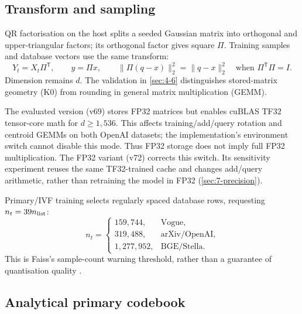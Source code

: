 \subsection{Transform and sampling}

QR factorisation on the host splits a seeded Gaussian matrix into
orthogonal and upper-triangular factors; its orthogonal factor gives
square $\Pi$. Training samples and database vectors use the same transform:
\begin{equation}
 Y_t=X_t\Pi^{\mathsf T},\qquad y=\Pi x,\qquad
 \|\Pi(q-x)\|_2^2=\|q-x\|_2^2
 \quad\text{when }\Pi^{\mathsf T}\Pi=I.
 \label{eq:4-transform}
\end{equation}
Dimension remains $d$. The validation in \cref{sec:4-6} distinguishes
stored-matrix geometry (K0) from rounding in general matrix
multiplication (GEMM).

The evaluated version (v69) stores FP32 matrices but enables cuBLAS
TF32 tensor-core math for $d\geq1{,}536$. This affects
training/add/query rotation and centroid GEMMs on both OpenAI datasets;
the implementation's environment switch cannot disable this mode. Thus FP32 storage does
not imply full FP32 multiplication. The FP32 variant (v72)
corrects this switch. Its sensitivity experiment reuses the same
TF32-trained cache and changes add/query arithmetic, rather than retraining
the model in FP32 (\cref{sec:7-precision}).

Primary/IVF training selects regularly spaced database rows, requesting
$n_t=39n_{\rm list}$:
\[
 n_t=\begin{cases}159{,}744,&\text{Vogue},\\319{,}488,&\text{arXiv/OpenAI},\\1{,}277{,}952,&\text{BGE/Stella}.\end{cases}
\]
This is Faiss's sample-count warning threshold, rather than a guarantee
of quantisation quality \cite{faiss_clustering}.

\subsection{Analytical primary codebook}

